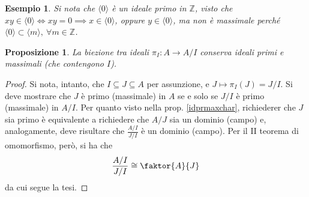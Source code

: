 \documentclass[11pt]{article}
\theoremstyle{style}
\newtheorem{esempio}{Esempio}[section]
\newtheorem{prop}{Proposizione}[section]
\numberwithin{equation}{subsection}
\begin{document}
\begin{esempio}
Si nota che $\langle 0 \rangle $ \`e un ideale primo in $\mathbb{Z}$, visto che $xy \in \langle 0 \rangle \iff xy = 0\implies x \in \langle 0 \rangle$, oppure $y \in \langle 0 \rangle$, ma non \`e massimale perch\'e $\langle 0 \rangle\subset \langle m \rangle  , \ \forall m \in \mathbb{Z}$.
\end{esempio}
\begin{prop}
	La biezione tra ideali $\pi_I : A \to A/I$ conserva ideali primi e massimali (che contengono $I$).
\end{prop}
	\begin{proof}
		Si nota, intanto, che $I \subseteq J \subseteq A$ per assunzione, e $J\longmapsto \pi_I(J) = J / I$.
		Si deve mostrare che $J$ \`e primo (massimale) in $A$ se e solo se $J / I$ \`e primo (massimale) in $A / I$.
		Per quanto visto nella prop. \ref{idprmaxchar}, richiederer che $J $ sia primo \`e equivalente a richiedere che $A / J$ sia un dominio (campo) e, analogamente, deve risultare che $\frac{A / I}{J / I}$ \`e un dominio (campo).
		Per il II teorema di omomorfismo, per\`o, si ha che
		\[
			\frac{A / I }{J / I}\cong \faktor{A}{J}
		\] 
		da cui segue la tesi.
	\end{proof}
\end{document}
